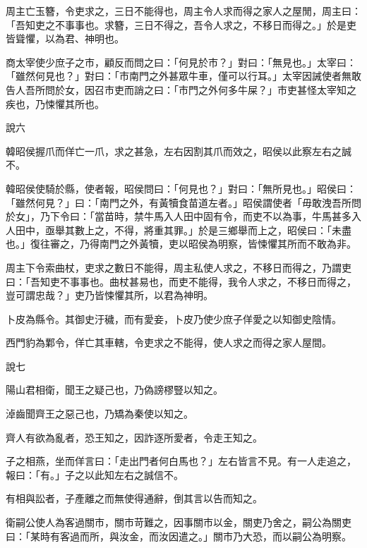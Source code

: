 \begin{pinyinscope}
周主亡玉簪，令吏求之，三日不能得也，周主令人求而得之家人之屋閒，周主曰：「吾知吏之不事事也。求簪，三日不得之，吾令人求之，不移日而得之。」於是吏皆聳懼，以為君、神明也。

商太宰使少庶子之市，顧反而問之曰：「何見於市？」對曰：「無見也。」太宰曰：「雖然何見也？」對曰：「市南門之外甚眾牛車，僅可以行耳。」太宰因誡使者無敢告人吾所問於女，因召市吏而誚之曰：「市門之外何多牛屎？」市吏甚怪太宰知之疾也，乃悚懼其所也。

說六

韓昭侯握爪而佯亡一爪，求之甚急，左右因割其爪而效之，昭侯以此察左右之誠不。

韓昭侯使騎於縣，使者報，昭侯問曰：「何見也？」對曰：「無所見也。」昭侯曰：「雖然何見？」曰：「南門之外，有黃犢食苗道左者。」昭侯謂使者「毋敢洩吾所問於女」，乃下令曰：「當苗時，禁牛馬入人田中固有令，而吏不以為事，牛馬甚多入人田中，亟舉其數上之，不得，將重其罪。」於是三鄉舉而上之，昭侯曰：「未盡也。」復往審之，乃得南門之外黃犢，吏以昭侯為明察，皆悚懼其所而不敢為非。

周主下令索曲杖，吏求之數日不能得，周主私使人求之，不移日而得之，乃謂吏曰：「吾知吏不事事也。曲杖甚易也，而吏不能得，我令人求之，不移日而得之，豈可謂忠哉？」吏乃皆悚懼其所，以君為神明。

卜皮為縣令。其御史汙穢，而有愛妾，卜皮乃使少庶子佯愛之以知御史陰情。

西門豹為鄴令，佯亡其車轄，令吏求之不能得，使人求之而得之家人屋間。

說七

陽山君相衛，聞王之疑己也，乃偽謗樛豎以知之。

淖齒聞齊王之惡己也，乃矯為秦使以知之。

齊人有欲為亂者，恐王知之，因詐逐所愛者，令走王知之。

子之相燕，坐而佯言曰：「走出門者何白馬也？」左右皆言不見。有一人走追之，報曰：「有。」子之以此知左右之誠信不。

有相與訟者，子產離之而無使得通辭，倒其言以告而知之。

衛嗣公使人為客過關市，關市苛難之，因事關市以金，關吏乃舍之，嗣公為關吏曰：「某時有客過而所，與汝金，而汝因遣之。」關市乃大恐，而以嗣公為明察。


\end{pinyinscope}